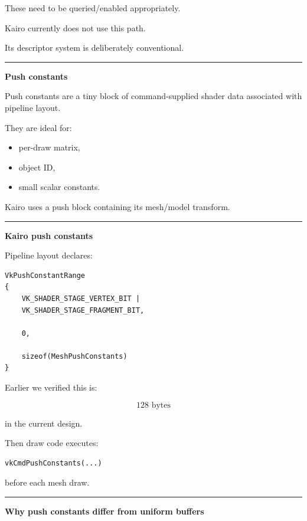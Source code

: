 These need to be queried/enabled appropriately.

Kairo currently does not use this path.

Its descriptor system is deliberately conventional.

\begin{center}\rule{0.5\linewidth}{0.5pt}\end{center}

\textbf{Push constants}

Push constants are a tiny block of command-supplied shader data associated with pipeline layout.

They are ideal for:

\begin{itemize}
\tightlist
\item
  per-draw matrix,
\item
  object ID,
\item
  small scalar constants.
\end{itemize}

Kairo uses a push block containing its mesh/model transform.

\begin{center}\rule{0.5\linewidth}{0.5pt}\end{center}

\textbf{Kairo push constants}

Pipeline layout declares:

\begin{verbatim}
VkPushConstantRange
{
    VK_SHADER_STAGE_VERTEX_BIT |
    VK_SHADER_STAGE_FRAGMENT_BIT,

    0,

    sizeof(MeshPushConstants)
}
\end{verbatim}

Earlier we verified this is:

\[
128\text{ bytes}
\]

in the current design.

Then draw code executes:

\begin{verbatim}
vkCmdPushConstants(...)
\end{verbatim}

before each mesh draw.

\begin{center}\rule{0.5\linewidth}{0.5pt}\end{center}

\textbf{Why push constants differ from uniform buffers}

